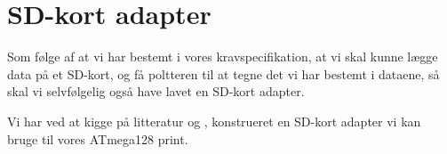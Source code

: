 
\section{SD-kort adapter}
Som følge af at vi har bestemt i vores kravspecifikation, at vi skal kunne lægge data på et
SD-kort, og få poltteren til at tegne det vi har bestemt i dataene, så
skal vi selvfølgelig også have lavet en SD-kort adapter.

Vi har ved at kigge på litteratur \cite{web:captain-mmc} og
\cite{web:sd-pinout}, konstrueret en SD-kort adapter vi kan bruge til
vores ATmega128 print.


